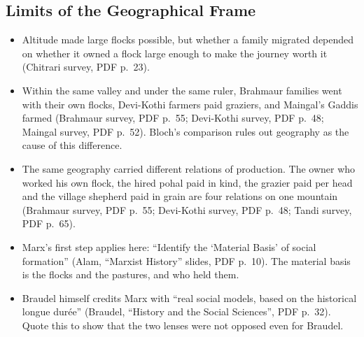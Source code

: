 \documentclass[11pt,a4paper]{article}
\newcommand{\cit}[1]{{\small(#1)}}
\newcommand{\Braudel}{Braudel, \enquote{History and the Social Sciences}}
\begin{document}
\subsection{Limits of the Geographical Frame}
\begin{itemize}
\item Altitude made large flocks possible, but whether a family migrated
  depended on whether it owned a flock large enough to make the journey worth
  it \cit{Chitrari survey, PDF p.~23}.
\item Within the same valley and under the same ruler, Brahmaur families went
  with their own flocks, Devi-Kothi farmers paid graziers, and Maingal's Gaddis
  farmed \cit{Brahmaur survey, PDF p.~55; Devi-Kothi survey, PDF p.~48; Maingal
  survey, PDF p.~52}. Bloch's comparison rules out geography as the cause of
  this difference.
\item The same geography carried different relations of production. The owner
  who worked his own flock, the hired pohal paid in kind, the grazier paid per
  head and the village shepherd paid in grain are four relations on one
  mountain \cit{Brahmaur survey, PDF p.~55; Devi-Kothi survey, PDF p.~48; Tandi
  survey, PDF p.~65}.
\item Marx's first step applies here: \enquote{Identify the `Material Basis' of
  social formation} \cit{Alam, \enquote{Marxist History} slides, PDF p.~10}. The
  material basis is the flocks and the pastures, and who held them.
\item Braudel himself credits Marx with \enquote{real social models, based on the
  historical longue durée} \cit{\Braudel, PDF p.~32}. Quote this to show that
  the two lenses were not opposed even for Braudel.
\end{itemize}
\end{document}

